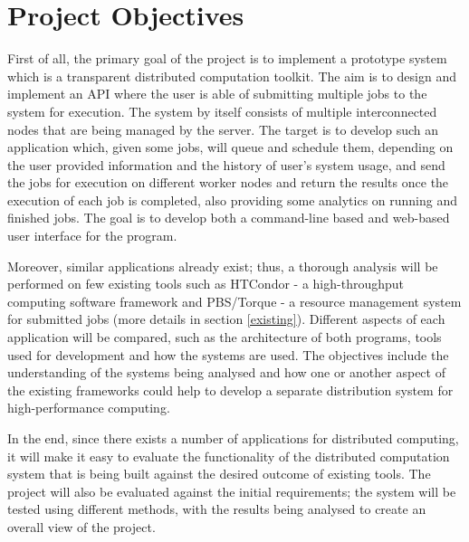 \documentclass[10pt]{report}
\begin{document}
\section{Project Objectives} \label{objectives}

First of all, the primary goal of the project is to implement a prototype system which is a transparent distributed computation toolkit. The aim is to design and implement an API where the user is able of submitting multiple jobs to the system for execution. The system by itself consists of multiple interconnected nodes that are being managed by the server. The target is to develop such an application which, given some jobs, will queue and schedule them, depending on the user provided information and the history of user's system usage, and send the jobs for execution on different worker nodes and return the results once the execution of each job is completed, also providing some analytics on running and finished jobs. The goal is to develop both a command-line based and web-based user interface for the program.
\newline

Moreover, similar applications already exist; thus, a thorough analysis will be performed on few existing tools such as HTCondor - a high-throughput computing software framework and PBS/Torque - a resource management system for submitted jobs (more details in section \ref{existing}). Different aspects of each application will be compared, such as the architecture of both programs, tools used for development and how the systems are used. The objectives include the understanding of the systems being analysed and how one or another aspect of the existing frameworks could help to develop a separate distribution system for high-performance computing.
\newline

In the end, since there exists a number of applications for distributed computing, it will make it easy to evaluate the functionality of the distributed computation system that is being built against the desired outcome of existing tools. The project will also be evaluated against the initial requirements; the system will be tested using different methods, with the results being analysed to create an overall view of the project.

\end{document}
